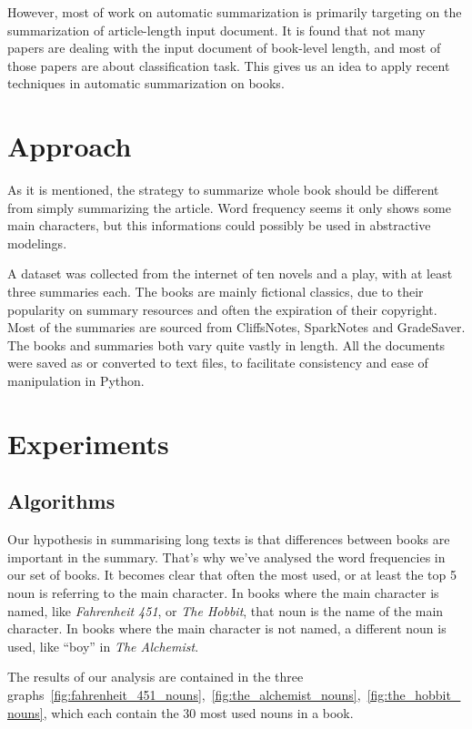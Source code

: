 However, most of work on automatic summarization is primarily targeting on
the summarization of article-length input document. It is found that not many
papers are dealing with the input document of book-level length, and most of
those papers are about classification task. This gives us an idea to apply
recent techniques in automatic summarization on books.


\section{Approach}
As it is mentioned, the strategy to summarize whole book should be different
from simply summarizing the article. Word frequency seems it only shows some
main characters, but this informations could possibly be used in abstractive
modelings. 

A dataset was collected from the internet of ten novels and a play, with at
least three summaries each. The books are mainly fictional classics, due to
their popularity on summary resources and often the expiration of their
copyright. Most of the summaries are sourced from CliffsNotes, SparkNotes and
GradeSaver. The books and summaries both vary quite vastly in length. All the
documents were saved as or converted to text files, to facilitate consistency
and ease of manipulation in Python.

\section{Experiments}

\subsection{Algorithms}

Our hypothesis in summarising long texts is that differences between books are
important in the summary. That's why we've analysed the word frequencies in our
set of books. It becomes clear that often the most used, or at least the top 5
noun is referring to the main character. In books where the main character is
named, like \textit{Fahrenheit 451}, or \textit{The Hobbit}, that noun is the
name of the main character. In books where the main character is not named, a
different noun is used, like ``boy'' in \textit{The Alchemist}.

The results of our analysis are contained in the three
graphs~\ref{fig:fahrenheit_451_nouns},~\ref{fig:the_alchemist_nouns},~\ref{fig:the_hobbit_nouns},
which each contain the 30 most used nouns in a book.

